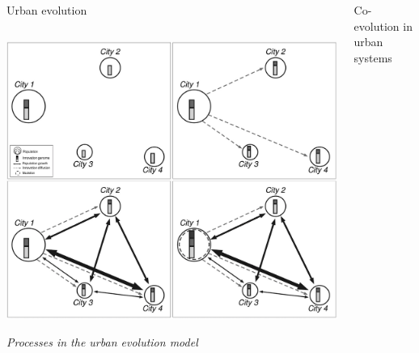 \documentclass{beamer}
\begin{document}
\begin{frame}{}
\begin{columns}[t]
\begin{column}{.49\textwidth}
\begin{block}{Urban evolution}
\begin{columns}[t]
\begin{column}{.95\textwidth}
        \bigskip
        
        \begin{center}
        \includegraphics[width=\textwidth]{figures/urbanevol_Fig2.png}
        
        {\small\textit{Processes in the urban evolution model \cite{raimbault2020spatial}}}
        
        \end{center}
        
        
          \end{column}
          \end{columns}
        \end{block}

        
      
      \end{column}
      
      
      
      \begin{column}{.49\textwidth}
      
      \vspace{-1cm}
      
      
       
    
        
      
      
      
       \begin{block}{Co-evolution in urban systems}
        \vspace{-1.5cm}
          \begin{columns}[t]
        \begin{column}{.95\textwidth}
        

\end{column}
\end{columns}
\end{block}
\end{column}
\end{columns}
\end{frame}
\end{document}
